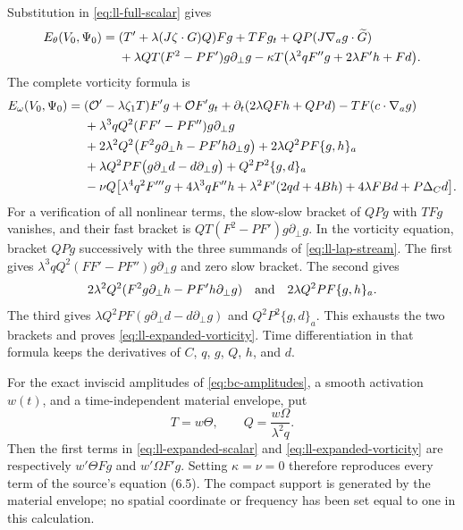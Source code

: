 Substitution in \eqref{eq:ll-full-scalar} gives
\begin{align}
E_\theta(V_0,\Psi_0)={}&
 (T'+\lambda(J\zeta\cdot G)Q)Fg+TFg_t
 +QP(J\nabla_ag\cdot\widetilde G)
\notag\\
&+\lambda QT(F^2-PF')g\partial_\perp g
 -\kappa T\bigl(\lambda^2qF''g+2\lambda F'h+Fd\bigr).
\label{eq:ll-expanded-scalar}
\end{align}
The complete vorticity formula is
\begin{align}
E_\omega(V_0,\Psi_0)={}&
 (\mathcal O'-\lambda\zeta_1T)F'g+\mathcal O F'g_t
 +\partial_t(2\lambda QFh+QP d)-TF(c\cdot\nabla_ag)
\notag\\
&+\lambda^3qQ^2(FF'-PF'')g\partial_\perp g
\notag\\
&+2\lambda^2Q^2\bigl(F^2g\partial_\perp h-PF'h\partial_\perp g\bigr)
 +2\lambda Q^2PF\{g,h\}_a
\notag\\
&+\lambda Q^2PF\bigl(g\partial_\perp d-d\partial_\perp g\bigr)
 +Q^2P^2\{g,d\}_a
\notag\\
&-\nu Q\bigl[
 \lambda^4q^2F'''g+4\lambda^3qF''h
 +\lambda^2F'(2qd+4Bh)+4\lambda F Bd+P\Delta_Cd\bigr].
\label{eq:ll-expanded-vorticity}
\end{align}
For a verification of all nonlinear terms, the slow-slow bracket of
$QP g$ with $TFg$ vanishes, and their fast bracket is
$QT(F^2-PF')g\partial_\perp g$.
In the vorticity equation, bracket $QP g$ successively with the three
summands of \eqref{eq:ll-lap-stream}. The first gives
$\lambda^3qQ^2(FF'-PF'')g\partial_\perp g$ and zero slow bracket.
The second gives
\[
2\lambda^2Q^2(F^2g\partial_\perp h-PF'h\partial_\perp g)
\quad\hbox{and}\quad 2\lambda Q^2PF\{g,h\}_a.
\]
The third gives
$\lambda Q^2PF(g\partial_\perp d-d\partial_\perp g)$ and
$Q^2P^2\{g,d\}_a$. This exhausts the two brackets and proves
\eqref{eq:ll-expanded-vorticity}.
Time differentiation in that formula keeps the derivatives of $C$,
$q$, $g$, $Q$, $h$, and $d$.

For the exact inviscid amplitudes of \eqref{eq:bc-amplitudes}, a smooth
activation $w(t)$, and a time-independent material envelope, put
\[
T=w\Theta,\qquad Q=\frac{w\Omega}{\lambda^2q}.
\]
Then the first terms in \eqref{eq:ll-expanded-scalar} and
\eqref{eq:ll-expanded-vorticity} are respectively $w'\Theta Fg$ and
$w'\Omega F'g$. Setting $\kappa=\nu=0$ therefore reproduces every
term of the source's equation (6.5). The compact support is generated
by the material envelope; no spatial coordinate or frequency has been
set equal to one in this calculation.

